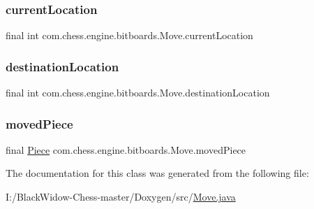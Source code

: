 \subsubsection{\texorpdfstring{currentLocation}{currentLocation}}
{\footnotesize\ttfamily final int com.\+chess.\+engine.\+bitboards.\+Move.\+current\+Location\hspace{0.3cm}{\ttfamily [package]}}

\mbox{\label{classcom_1_1chess_1_1engine_1_1bitboards_1_1_move_ae9432b9156a87e04f3417ba1da2cc7a7}} 
\subsubsection{\texorpdfstring{destinationLocation}{destinationLocation}}
{\footnotesize\ttfamily final int com.\+chess.\+engine.\+bitboards.\+Move.\+destination\+Location\hspace{0.3cm}{\ttfamily [package]}}

\mbox{\label{classcom_1_1chess_1_1engine_1_1bitboards_1_1_move_aa1935c00c3dfb338e4007b7202b66830}} 
\subsubsection{\texorpdfstring{movedPiece}{movedPiece}}
{\footnotesize\ttfamily final \mbox{\hyperlink{enumcom_1_1chess_1_1engine_1_1bitboards_1_1_bit_board_1_1_piece}{Piece}} com.\+chess.\+engine.\+bitboards.\+Move.\+moved\+Piece\hspace{0.3cm}{\ttfamily [package]}}



The documentation for this class was generated from the following file\+:\begin{DoxyCompactItemize}
\item 
I\+:/\+Black\+Widow-\/\+Chess-\/master/\+Doxygen/src/\mbox{\hyperlink{_move_8java}{Move.\+java}}\end{DoxyCompactItemize}
